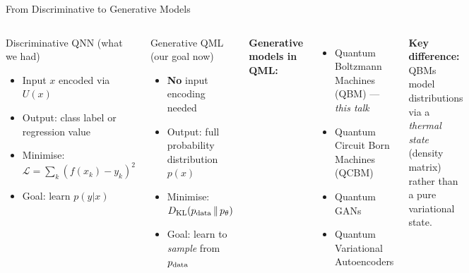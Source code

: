\documentclass[aspectratio=169,10pt]{beamer}
\newcommand{\KL}[2]{D_{\mathrm{KL}}\!\left(#1\,\|\,#2\right)}
\begin{document}
\begin{frame}{From Discriminative to Generative Models}
  \begin{columns}[T]
      \begin{block}{Discriminative QNN (what we had)}
        \begin{itemize}\itemsep1pt
          \item Input $x$ encoded via $U(x)$
          \item Output: class label or regression value
          \item Minimise: $\mathcal{L} = \sum_k (f(x_k)-y_k)^2$
          \item Goal: learn $p(y|x)$
        \end{itemize}
      \end{block}
      \vspace{0.15cm}
      \begin{alertblock}{Generative QML (our goal now)}
        \begin{itemize}\itemsep1pt
          \item \textbf{No} input encoding needed
          \item Output: full probability distribution $p(x)$
          \item Minimise: $\KL{p_{\rm data}}{p_\theta}$
          \item Goal: learn to \emph{sample} from $p_{\rm data}$
        \end{itemize}
      \end{alertblock}
      \textbf{Generative models in QML:}
      \begin{itemize}\itemsep2pt
        \item Quantum Boltzmann Machines (QBM) — \emph{this talk}
        \item Quantum Circuit Born Machines (QCBM)
        \item Quantum GANs
        \item Quantum Variational Autoencoders
      \end{itemize}
      \vspace{0.2cm}
      \textbf{Key difference:}\\
      QBMs model distributions via a \emph{thermal state}
      (density matrix) rather than a pure variational state.
  \end{columns}
\end{frame}

\end{document}
